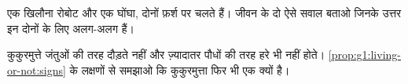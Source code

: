 \begin{exercise}[$\star\star$]\label{exo:g1:living-or-not:9}
एक खिलौना रोबोट और एक घोंघा, दोनों फ़र्श पर चलते हैं। जीवन के दो ऐसे
सवाल बताओ जिनके उत्तर इन दोनों के लिए अलग-अलग हैं।
\end{exercise}

\begin{exercise}[$\star\star$]\label{exo:g1:living-or-not:10}
कुकुरमुत्ते जंतुओं की तरह दौड़ते नहीं और ज़्यादातर पौधों की तरह हरे
भी नहीं होते। \cref{prop:g1:living-or-not:signs} के लक्षणों से समझाओ
कि कुकुरमुत्ता फिर भी एक  क्यों है।
\end{exercise}
